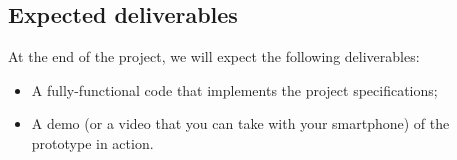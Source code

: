 \subsection{Expected deliverables}

At the end of the project, we will expect the following deliverables: 
\begin{itemize}
	\item A fully-functional code that implements the project specifications; 
	\item A demo (or a video that you can take with your smartphone) of the prototype in action. 
\end{itemize}




